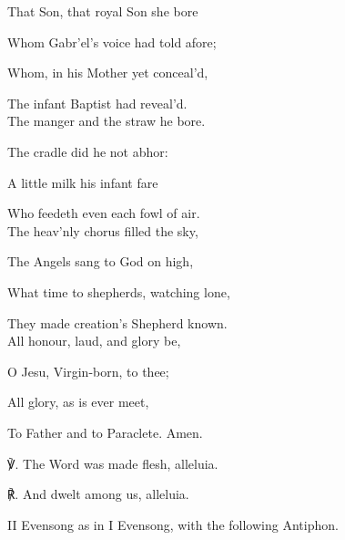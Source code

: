 \begin{paracol}{2}[]
\begin{hangparas}{1.25em}{1}
That Son, that royal Son she bore

Whom Gabr'el's voice had told afore;

Whom, in his Mother yet conceal'd,

The infant Baptist had reveal'd.\\

The manger and the straw he bore.

The cradle did he not abhor:

A little milk his infant fare

Who feedeth even each fowl of air.\\

The heav'nly chorus filled the sky,

The Angels sang to God on high,

What time to shepherds, watching lone,

They made creation's Shepherd known.\\

All honour, laud, and glory be,

O Jesu, Virgin-born, to thee;

All glory, as is ever meet,

To Father and to Paraclete. Amen.\\
\end{hangparas}

℣. The Word was made flesh, alleluia.

℟. And dwelt among us, alleluia.


\fussy
\end{paracol}

\begin{rubric}
	II Evensong as in I Evensong, with the following Antiphon.
\end{rubric}




